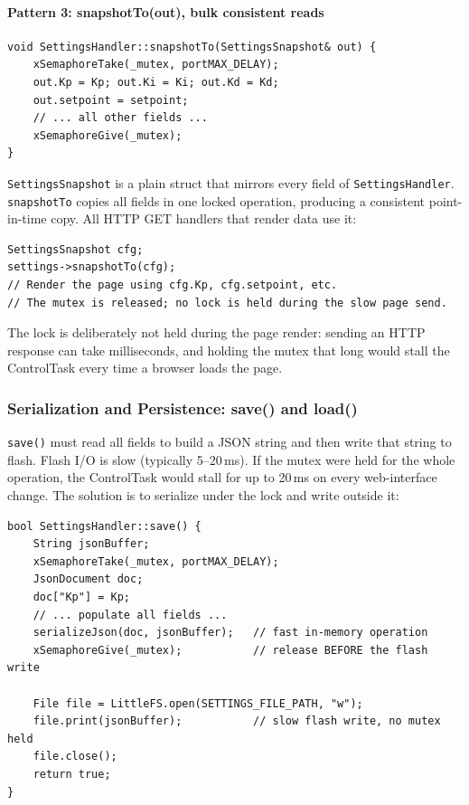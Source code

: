 \paragraph{Pattern 3: snapshotTo(out), bulk consistent reads}

\begin{lstlisting}[caption=SettingsHandler::snapshotTo - Atomic Multi-field Read]
void SettingsHandler::snapshotTo(SettingsSnapshot& out) {
    xSemaphoreTake(_mutex, portMAX_DELAY);
    out.Kp = Kp; out.Ki = Ki; out.Kd = Kd;
    out.setpoint = setpoint;
    // ... all other fields ...
    xSemaphoreGive(_mutex);
}
\end{lstlisting}

\texttt{SettingsSnapshot} is a plain struct that mirrors every field of
\texttt{SettingsHandler}. \texttt{snapshotTo} copies all fields in one locked operation,
producing a consistent point-in-time copy. All HTTP GET handlers that render data use it:

\begin{lstlisting}[caption=Using snapshotTo()]
SettingsSnapshot cfg;
settings->snapshotTo(cfg);
// Render the page using cfg.Kp, cfg.setpoint, etc.
// The mutex is released; no lock is held during the slow page send.
\end{lstlisting}

The lock is deliberately not held during the page render: sending an HTTP response can
take milliseconds, and holding the mutex that long would stall the ControlTask every time
a browser loads the page.

\subsubsection{Serialization and Persistence: save() and load()}

\texttt{save()} must read all fields to build a JSON string and then write that string to
flash. Flash I/O is slow (typically 5--20\,ms). If the mutex were held for the whole
operation, the ControlTask would stall for up to 20\,ms on every web-interface change.
The solution is to serialize under the lock and write outside it:

\begin{lstlisting}[caption={SettingsHandler::save - Serialize Under Lock, Write Outside}]
bool SettingsHandler::save() {
    String jsonBuffer;
    xSemaphoreTake(_mutex, portMAX_DELAY);
    JsonDocument doc;
    doc["Kp"] = Kp;
    // ... populate all fields ...
    serializeJson(doc, jsonBuffer);   // fast in-memory operation
    xSemaphoreGive(_mutex);           // release BEFORE the flash write

    File file = LittleFS.open(SETTINGS_FILE_PATH, "w");
    file.print(jsonBuffer);           // slow flash write, no mutex held
    file.close();
    return true;
}
\end{lstlisting}

